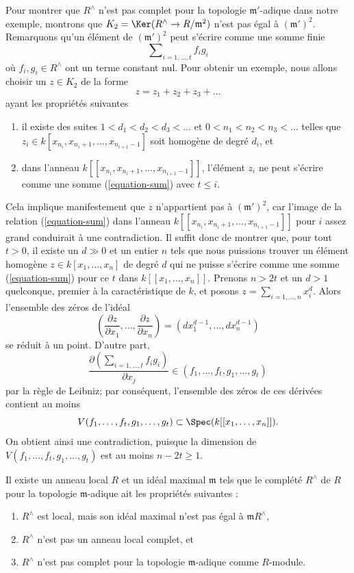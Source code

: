 \medskip\noindent
Pour montrer que $R^\wedge$ n'est pas complet pour la topologie $\mathfrak m'$-adique
dans notre exemple, montrons que $K_2 = \Ker(R^\wedge \to R/\mathfrak m^2)$
n'est pas égal à $(\mathfrak m')^2$.
Remarquons qu'un élément de $(\mathfrak m')^2$
peut s'écrire comme une somme finie
\begin{equation}
\label{equation-sum}
\sum\nolimits_{i = 1, \ldots, t} f_i g_i
\end{equation}
où $f_i, g_i \in R^\wedge$ ont un terme constant nul.
Pour obtenir un exemple, nous allons choisir un $z \in K_2$
de la forme
$$
z = z_1 + z_2 + z_3 + \ldots
$$
ayant les propriétés suivantes
\begin{enumerate}
\item il existe des suites $1 < d_1 < d_2 < d_3 < \ldots $ et
$0 < n_1 < n_2 < n_3 < \ldots$ telles que
$z_i \in k[x_{n_i}, x_{n_i + 1}, \ldots, x_{n_{i + 1} - 1}]$
soit homogène de degré $d_i$, et
\item dans l'anneau $k[[x_{n_i}, x_{n_i + 1}, \ldots, x_{n_{i + 1} - 1}]]$,
l'élément $z_i$ ne peut s'écrire comme une somme (\ref{equation-sum})
avec $t \leq i$.
\end{enumerate}
Cela implique manifestement que $z$ n'appartient pas à $(\mathfrak m')^2$,
car l'image de la relation (\ref{equation-sum}) dans
l'anneau $k[[x_{n_i}, x_{n_i + 1}, \ldots, x_{n_{i + 1} - 1}]]$
pour $i$ assez grand conduirait à une contradiction. Il suffit donc
de montrer que, pour tout $t > 0$, il existe un $d \gg 0$ et un entier
$n$ tels que nous puissions trouver un élément homogène
$z \in k[x_1, \ldots, x_n]$ de degré $d$ qui ne puisse s'écrire comme
une somme (\ref{equation-sum}) pour ce $t$ dans $k[[x_1, \ldots, x_n]]$.
Prenons $n > 2t$ et un $d > 1$ quelconque, premier à la caractéristique de $k$, et
posons $z = \sum_{i = 1, \ldots, n} x_i^d$. Alors l'ensemble des zéros
de l'idéal
$$
(\frac{\partial z}{\partial x_1}, \ldots, \frac{\partial z}{\partial x_n})
=
(dx_1^{d - 1}, \ldots, dx_n^{d - 1})
$$
se réduit à un point. D'autre part,
$$
\frac{\partial ( \sum\nolimits_{i = 1, \ldots, t} f_i g_i ) }{\partial x_j}
\in (f_1, \ldots, f_t, g_1, \ldots, g_t)
$$
par la règle de Leibniz; par conséquent, l'ensemble des zéros de ces dérivées
contient au moins
$$
V(f_1, \ldots, f_t, g_1, \ldots, g_t) \subset
\Spec(k[[x_1, \ldots, x_n]]).
$$
On obtient ainsi une contradiction, puisque la dimension de
$V(f_1, \ldots, f_t, g_1, \ldots, g_t)$ est au moins $n - 2t \geq 1$.

\begin{lemma}
\label{lemma-noncomplete-completion}
Il existe un anneau local $R$ et un idéal maximal $\mathfrak m$ tels que
le complété $R^\wedge$ de $R$ pour la topologie $\mathfrak m$-adique ait les
propriétés suivantes :
\begin{enumerate}
\item $R^\wedge$ est local, mais son idéal maximal n'est pas égal à
$\mathfrak m R^\wedge$,
\item $R^\wedge$ n'est pas un anneau local complet, et
\item $R^\wedge$ n'est pas complet pour la topologie $\mathfrak m$-adique comme $R$-module.
\end{enumerate}
\end{lemma}

